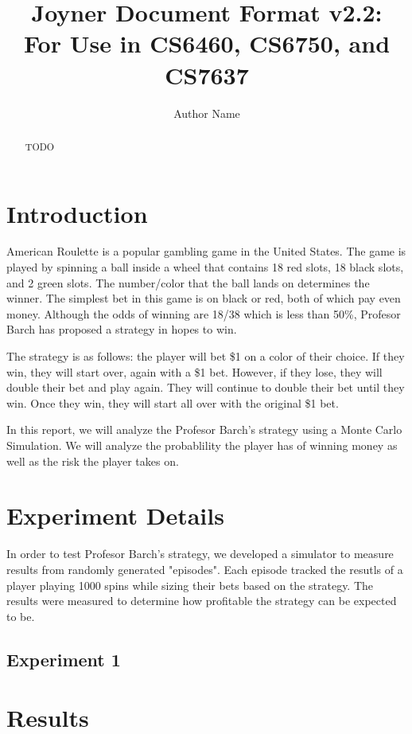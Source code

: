 \documentclass[
	letterpaper, %
]{jdf}
\author{Author Name}
\title{Joyner Document Format v2.2:\\For Use in CS6460, CS6750, and CS7637}
\begin{document}

\maketitle

\begin{abstract}
	TODO
\end{abstract}

\section{Introduction}
American Roulette is a popular gambling game in the United States. The game is played by spinning a ball inside a wheel that contains 18
red slots, 18 black slots, and 2 green slots. The number/color that the ball lands on determines the winner. The simplest bet in this game is 
on black or red, both of which pay even money. Although the odds of winning are 18/38 which is less than 50\%, Profesor Barch has proposed a 
strategy in hopes to win.

The strategy is as follows: the player will bet \$1 on a color of their choice. If they win, they will start over, again with a \$1 bet. 
However, if they lose, they will double their bet and play again. They will continue to double their bet until they win. Once they win,
they will start all over with the original \$1 bet.

In this report, we will analyze the Profesor Barch's strategy using a Monte Carlo Simulation. We will analyze the probablility the player has of winning
money as well as the risk the player takes on.

\section{Experiment Details}
In order to test Profesor Barch's strategy, we developed a simulator to measure results from randomly generated "episodes".
Each episode tracked the resutls of a player playing 1000 spins while sizing their bets based on the strategy.
The results were measured to determine how profitable the strategy can be expected to be.


\subsection{Experiment 1}


\section{Results}
\end{document}
